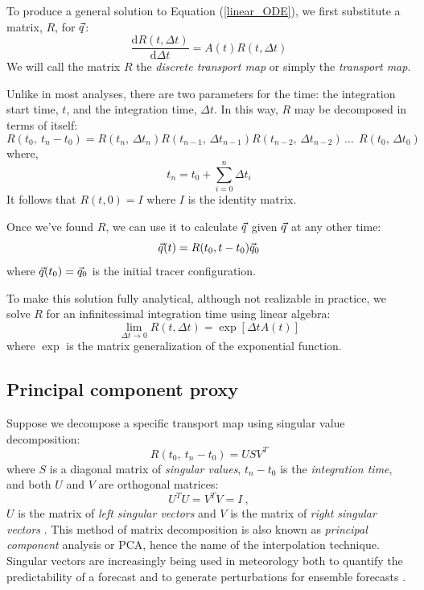 \documentclass{article}
\begin{document}
To produce a general solution to Equation (\ref{linear_ODE}), 
we first substitute a matrix, $R$, for $\vec q$:
\begin{equation}
	\frac{\mathrm d R(t, \Delta t)}{\mathrm d \Delta t} = A(t) R(t, \Delta t)
\end{equation}
We will call the matrix $R$ the {\it discrete transport map} or simply
the {\it transport map}.

Unlike in most analyses, there are two parameters for the time:
the integration start time, $t$, and the integration time, $\Delta t$.
In this way, $R$ may be decomposed in terms of itself:
\begin{equation}
	R(t_0,~t_n-t_0) = R(t_n, \, \Delta t_n) R(t_{n-1},\,\Delta t_{n-1}) R(t_{n-2},\,\Delta t_{n-2}) \, ...~~ 
	R(t_0,\,\Delta t_0)
\label{matrix_soln_decomposition}
\end{equation}
where,
\begin{equation}
t_n=t_0+\sum_{i=0}^{n} \Delta t_i
\end{equation}
It follows that $R(t, 0)=I$ where $I$ is the identity matrix.

Once we've found $R$, 
we can use it to calculate $\vec q$ given $\vec q$ at any other time:
\begin{equation}
	\vec q(t) = R(t_0, t-t_0) \vec q_0
	\label{tracer_integration}
\end{equation}
where $\vec q(t_0)=\vec q_0$ is the initial tracer configuration.

To make this solution fully analytical, although not realizable in practice,
we solve $R$ for an infinitessimal integration time using linear algebra:
\begin{equation}
	\lim_{\Delta t \rightarrow 0} R(t, \Delta t) = \exp \left [ \Delta t A(t) \right ]
\end{equation}
where $\exp$ is the matrix generalization of the exponential function.

\subsection{Principal component proxy}

Suppose we decompose a specific transport map using singular value decomposition:
\begin{equation}
	R(t_0, ~ t_n - t_0) = U S V^T
	\label{SVD}
\end{equation}
where $S$ is a diagonal matrix of {\it singular values},
$t_n - t_0$ is the {\it integration time},
and both $U$ and $V$ are orthogonal matrices:
\begin{equation}
	U^T U = V^T V = I~,
\end{equation}
$U$ is the matrix of {\it left singular vectors} and 
$V$ is the matrix of {\it right singular vectors} \citep{Press_etal1992}.
This method of matrix decomposition is also known as {\it principal component}
analysis or PCA, hence the name of the interpolation technique.
Singular vectors are increasingly being used in meteorology both to quantify the
predictability of a forecast and to generate perturbations for ensemble
forecasts \citep{Tang_etal2006}.
\end{document}
